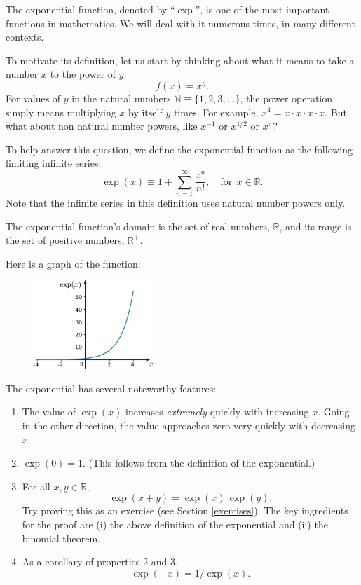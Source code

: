 \documentclass[10pt,a4paper]{article}
\begin{document}
The exponential function, denoted by ``$\exp$'', is one of the most
important functions in mathematics. We will deal with it numerous
times, in many different contexts.

To motivate its definition, let us start by thinking about what it
means to take a number $x$ to the power of $y$:
\begin{equation}
f(x) = x^y.
\end{equation}
For values of $y$ in the natural numbers $\mathbb{N} \equiv
\{1,2,3,\dots\}$, the power operation simply means multiplying $x$ by
itself $y$ times. For example, $x^4 = x \cdot x \cdot x \cdot x$. But
what about non natural number powers, like $x^{-1}$ or $x^{1/2}$ or
$x^{\pi}$?

To help answer this question, we define the exponential function as
the following limiting infinite series:
\begin{equation}
\exp(x) \equiv 1 + \sum_{n=1}^\infty\frac{x^n}{n!}, \quad\mathrm{for}\;\, x \in \mathbb{R}.
\end{equation}
Note that the infinite series in this definition uses natural number
powers only.

The exponential function's domain is the set of real numbers,
$\mathbb{R}$, and its range is the set of positive numbers,
$\mathbb{R}^+$.

\clearpage

Here is a graph of the function:

\begin{figure}[ht]
  \centering\includegraphics[width=0.4\textwidth]{exponential}
\end{figure}

The exponential has several noteworthy features:

\begin{enumerate}
\item
  The value of $\exp(x)$ increases \emph{extremely} quickly with
  increasing $x$. Going in the other direction, the value approaches
  zero very quickly with decreasing $x$.
\item
  $\exp(0) = 1$. (This follows from the definition of the
  exponential.)
\item
  For all $x, y \in \mathbb{R}$,
  \begin{equation}
    \exp(x+y) = \exp(x)\,\exp(y).
    \label{eq:exponential_add}
  \end{equation}
  Try proving this as an exercise (see Section \ref{exercises}). The
  key ingredients for the proof are (i) the above definition of the
  exponential and (ii) the binomial theorem.
\item
  As a corollary of properties 2 and 3,
  \begin{equation}
    \exp(-x) = 1/\exp(x).
  \end{equation}
\end{enumerate}
\end{document}
